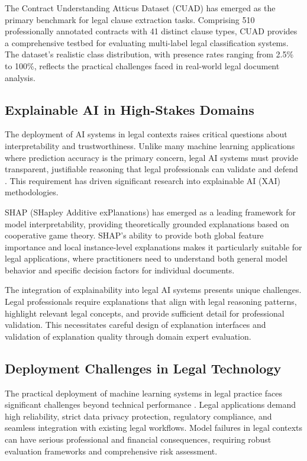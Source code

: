 The Contract Understanding Atticus Dataset (CUAD) \cite{hendrycks2021cuad} has emerged as the primary benchmark for legal clause extraction tasks. Comprising 510 professionally annotated contracts with 41 distinct clause types, CUAD provides a comprehensive testbed for evaluating multi-label legal classification systems. The dataset's realistic class distribution, with presence rates ranging from 2.5\% to 100\%, reflects the practical challenges faced in real-world legal document analysis.

\subsection{Explainable AI in High-Stakes Domains}

The deployment of AI systems in legal contexts raises critical questions about interpretability and trustworthiness. Unlike many machine learning applications where prediction accuracy is the primary concern, legal AI systems must provide transparent, justifiable reasoning that legal professionals can validate and defend \cite{molnar2020interpretable}. This requirement has driven significant research into explainable AI (XAI) methodologies.

SHAP (SHapley Additive exPlanations) \cite{lundberg2017unified} has emerged as a leading framework for model interpretability, providing theoretically grounded explanations based on cooperative game theory. SHAP's ability to provide both global feature importance and local instance-level explanations makes it particularly suitable for legal applications, where practitioners need to understand both general model behavior and specific decision factors for individual documents.

The integration of explainability into legal AI systems presents unique challenges. Legal professionals require explanations that align with legal reasoning patterns, highlight relevant legal concepts, and provide sufficient detail for professional validation. This necessitates careful design of explanation interfaces and validation of explanation quality through domain expert evaluation.

\subsection{Deployment Challenges in Legal Technology}

The practical deployment of machine learning systems in legal practice faces significant challenges beyond technical performance \cite{paleyes2022challenges}. Legal applications demand high reliability, strict data privacy protection, regulatory compliance, and seamless integration with existing legal workflows. Model failures in legal contexts can have serious professional and financial consequences, requiring robust evaluation frameworks and comprehensive risk assessment.


